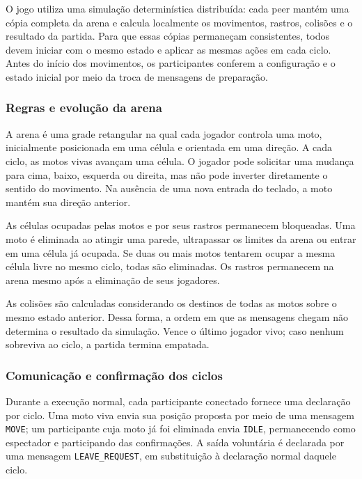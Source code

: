 \documentclass[11pt,a4paper]{article}
\begin{document}
O jogo utiliza uma simulação determinística distribuída: cada peer mantém uma cópia completa da arena e calcula localmente os movimentos, rastros, colisões e o resultado da partida. Para que essas cópias permaneçam consistentes, todos devem iniciar com o mesmo estado e aplicar as mesmas ações em cada ciclo. Antes do início dos movimentos, os participantes conferem a configuração e o estado inicial por meio da troca de mensagens de preparação.

\subsubsection{Regras e evolução da arena}

A arena é uma grade retangular na qual cada jogador controla uma moto, inicialmente posicionada em uma célula e orientada em uma direção. A cada ciclo, as motos vivas avançam uma célula. O jogador pode solicitar uma mudança para cima, baixo, esquerda ou direita, mas não pode inverter diretamente o sentido do movimento. Na ausência de uma nova entrada do teclado, a moto mantém sua direção anterior.

As células ocupadas pelas motos e por seus rastros permanecem bloqueadas. Uma moto é eliminada ao atingir uma parede, ultrapassar os limites da arena ou entrar em uma célula já ocupada. Se duas ou mais motos tentarem ocupar a mesma célula livre no mesmo ciclo, todas são eliminadas. Os rastros permanecem na arena mesmo após a eliminação de seus jogadores.

As colisões são calculadas considerando os destinos de todas as motos sobre o mesmo estado anterior. Dessa forma, a ordem em que as mensagens chegam não determina o resultado da simulação. Vence o último jogador vivo; caso nenhum sobreviva ao ciclo, a partida termina empatada.

\subsubsection{Comunicação e confirmação dos ciclos}

Durante a execução normal, cada participante conectado fornece uma declaração por ciclo. Uma moto viva envia sua posição proposta por meio de uma mensagem \texttt{MOVE}; um participante cuja moto já foi eliminada envia \texttt{IDLE}, permanecendo como espectador e participando das confirmações. A saída voluntária é declarada por uma mensagem \texttt{LEAVE\_REQUEST}, em substituição à declaração normal daquele ciclo.
\end{document}
